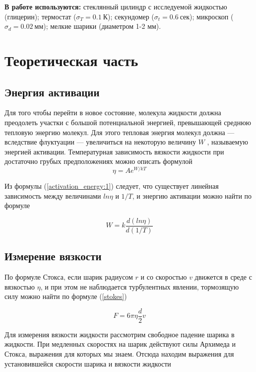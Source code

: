 \documentclass[a4paper, 12pt]{article}
\begin{document}
    \textbf{В работе используются:} стеклянный цилиндр с исследуемой жидкостью (глицерин); термостат ($\sigma_T = 0.1~К$); секундомер ($\sigma_t = 0.6~сек$); микроскоп ($\sigma_d = 0.02~мм$); мелкие шарики (диаметром 1-2 мм).

    \section{Теоретическая часть}
    \subsection{Энергия активации}
    Для того чтобы перейти в новое состояние, молекула жидкости должна преодолеть участки с большой потенциальной энергией, превышающей среднюю тепловую энергию молекул. Для этого тепловая энергия молекул должна — вследствие флуктуации — увеличиться на некоторую величину $W$ , называемую энергией активации. Температурная зависимость вязкости жидкости при достаточно грубых предположениях можно описать формулой
    \begin{equation} \label{activation_energy:1}
        \eta = A e^{W/kT}
    \end{equation}

    Из формулы (\ref{activation_energy:1}) следует, что существует линейная зависимость между величинами $ln\eta$ и $1/T$, и энергию активации можно найти по формуле

    \begin{equation} \label{activation_energy:2}
        W = k \frac{d(ln\eta)}{d(1/T)}
    \end{equation}

    \subsection{Измерение вязкости}
    По формуле Стокса, если шарик радиусом $r$ и со скоростью $v$ движется в среде с вязкостью $\eta$, и при этом не наблюдается турбулентных явлении, тормозящую силу можно найти по формуле (\ref{stokes})

    \begin{equation}\label{stokes}
        F = 6\pi\eta \frac{d}{2}v
    \end{equation}


    Для измерения вязкости жидкости рассмотрим свободное падение шарика в жидкости. При медленных скоростях на шарик действуют силы Архимеда и Стокса, выражения для которых мы знаем. Отсюда находим выражения для установившейся скорости шарика и вязкости жидкости
\end{document}
